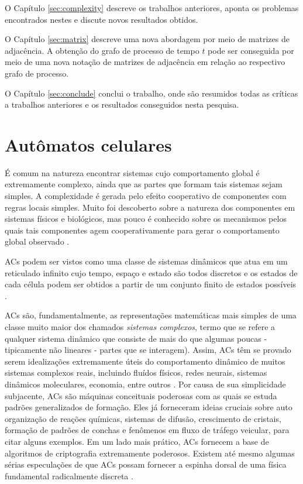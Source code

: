 \documentclass[12pt,a4paper]{article}
\begin{document}
O Capítulo \ref{sec:complexity} descreve os trabalhos anteriores, aponta
os problemas encontrados nestes e discute novos resultados obtidos.

O Capítulo \ref{sec:matrix} descreve uma nova abordagem por meio de matrizes
de adjacência. A obtenção do
grafo de processo de tempo $t$ pode ser conseguida por meio de uma nova notação de 
matrizes de adjacência em relação ao respectivo grafo de processo.

O Capítulo \ref{sec:conclude} conclui o trabalho, onde são resumidos todas
as críticas a trabalhos anteriores e os resultados conseguidos nesta pesquisa.

\newpage

\section{Autômatos celulares}\label{sec:refteo}

É comum na natureza encontrar sistemas cujo comportamento global é extremamente
complexo, ainda que as partes que formam tais sistemas sejam simples. A
complexidade é gerada pelo efeito cooperativo de componentes com regras locais
simples. Muito foi descoberto sobre a natureza dos componentes em sistemas físicos
e biológicos, mas pouco é conhecido sobre os mecanismos pelos quais tais componentes
agem cooperativamente para gerar o comportamento global observado .

ACs podem ser vistos como uma classe de sistemas dinâmicos que atua em um reticulado
infinito cujo tempo, espaço e estado são todos discretos e os estados de cada célula
podem ser obtidos a partir de um conjunto finito de estados possíveis . 

ACs são, fundamentalmente, as representações matemáticas mais simples
de uma classe muito maior dos chamados \textit{sistemas complexos}, termo que se refere
a qualquer sistema dinâmico que consiste de mais do que algumas poucas - tipicamente
não lineares - partes que se interagem). Assim, ACs têm se provado
serem idealizações extremamente úteis do comportamento dinâmico de muitos sistemas
complexos reais, incluindo fluídos físicos, redes neurais, sistemas dinâmicos
moleculares, economia, entre outros . Por causa de sua
simplicidade subjacente, ACs são máquinas
conceituais poderosas com as quais se estuda padrões generalizados de formação. Eles
já forneceram ideias cruciais sobre auto organização de reações químicas, sistemas de
difusão, crescimento de cristais, formação de padrões de conchas e fenômenos em fluxo
de tráfego veicular, para citar alguns exemplos. Em um lado mais prático, ACs
fornecem a base de algoritmos de criptografia extremamente poderosos. Existem
até mesmo algumas sérias especulações de que ACs possam fornecer
a espinha dorsal de uma física fundamental radicalmente discreta .
\end{document}
